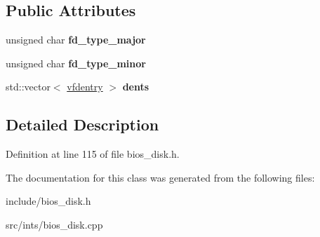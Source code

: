 \subsection*{Public Attributes}
\begin{DoxyCompactItemize}
\item 
\hypertarget{classimageDiskD88_ac78893683ee0ae39a20c484f66f4b93c}{unsigned char {\bfseries fd\-\_\-type\-\_\-major}}\label{classimageDiskD88_ac78893683ee0ae39a20c484f66f4b93c}

\item 
\hypertarget{classimageDiskD88_adee44970e1d1ef3ddb7c59074121afb6}{unsigned char {\bfseries fd\-\_\-type\-\_\-minor}}\label{classimageDiskD88_adee44970e1d1ef3ddb7c59074121afb6}

\item 
\hypertarget{classimageDiskD88_a9bff60346c5b14b0728d958cdcd4053a}{std\-::vector$<$ \hyperlink{structimageDiskD88_1_1vfdentry}{vfdentry} $>$ {\bfseries dents}}\label{classimageDiskD88_a9bff60346c5b14b0728d958cdcd4053a}

\end{DoxyCompactItemize}


\subsection{Detailed Description}


Definition at line 115 of file bios\-\_\-disk.\-h.



The documentation for this class was generated from the following files\-:\begin{DoxyCompactItemize}
\item 
include/bios\-\_\-disk.\-h\item 
src/ints/bios\-\_\-disk.\-cpp\end{DoxyCompactItemize}
